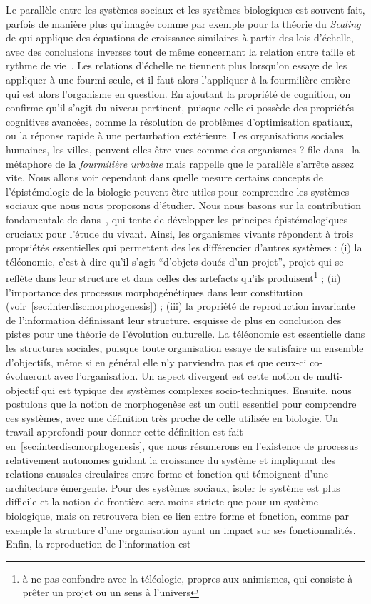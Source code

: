 Le parallèle entre les systèmes sociaux et les systèmes biologiques est souvent fait, parfois de manière plus qu'imagée comme par exemple pour la théorie du \emph{Scaling} de  qui applique des équations de croissance similaires à partir des lois d'échelle, avec des conclusions inverses tout de même concernant la relation entre taille et rythme de vie~\cite{bettencourt2007growth}. Les relations d'échelle ne tiennent plus lorsqu'on essaye de les appliquer à une fourmi seule, et il faut alors l'appliquer à la fourmilière entière qui est alors l'organisme en question. En ajoutant la propriété de cognition, on confirme qu'il s'agit du niveau pertinent, puisque celle-ci possède des propriétés cognitives avancées, comme la résolution de problèmes d'optimisation spatiaux, ou la réponse rapide à une perturbation extérieure. Les organisations sociales humaines, les villes, peuvent-elles être vues comme des organismes ?  file dans~\cite{banos2013pour} la métaphore de la \emph{fourmilière urbaine} mais rappelle que le parallèle s'arrête assez vite. Nous allons voir cependant dans quelle mesure certains concepts de l'épistémologie de la biologie peuvent être utiles pour comprendre les systèmes sociaux que nous nous proposons d'étudier. Nous nous basons sur la contribution fondamentale de  dans~\cite{monod1970hasard}, qui tente de développer les principes épistémologiques cruciaux pour l'étude du vivant. Ainsi, les organismes vivants répondent à trois propriétés essentielles qui permettent des les différencier d'autres systèmes : (i) la téléonomie, c'est à dire qu'il s'agit ``d'objets doués d'un projet'', projet qui se reflète dans leur structure et dans celles des artefacts qu'ils produisent\footnote{à ne pas confondre avec la téléologie, propres aux animismes, qui consiste à prêter un projet ou un sens à l'univers} ; (ii) l'importance des processus morphogénétiques dans leur constitution (voir~\ref{sec:interdiscmorphogenesis}) ; (iii) la propriété de reproduction invariante de l'information définissant leur structure.  esquisse de plus en conclusion des pistes pour une théorie de l'évolution culturelle. La téléonomie est essentielle dans les structures sociales, puisque toute organisation essaye de satisfaire un ensemble d'objectifs, même si en général elle n'y parviendra pas et que ceux-ci co-évolueront avec l'organisation. Un aspect divergent est cette notion de multi-objectif qui est typique des systèmes complexes socio-techniques. Ensuite, nous postulons que la notion de morphogenèse est un outil essentiel pour comprendre ces systèmes, avec une définition très proche de celle utilisée en biologie. Un travail approfondi pour donner cette définition est fait en~\ref{sec:interdiscmorphogenesis}, que nous résumerons en l'existence de processus relativement autonomes guidant la croissance du système et impliquant des relations causales circulaires entre forme et fonction qui témoignent d'une architecture émergente. Pour des systèmes sociaux, isoler le système est plus difficile et la notion de frontière sera moins stricte que pour un système biologique, mais on retrouvera bien ce lien entre forme et fonction, comme par exemple la structure d'une organisation ayant un impact sur ses fonctionnalités. Enfin, la reproduction de l'information est 